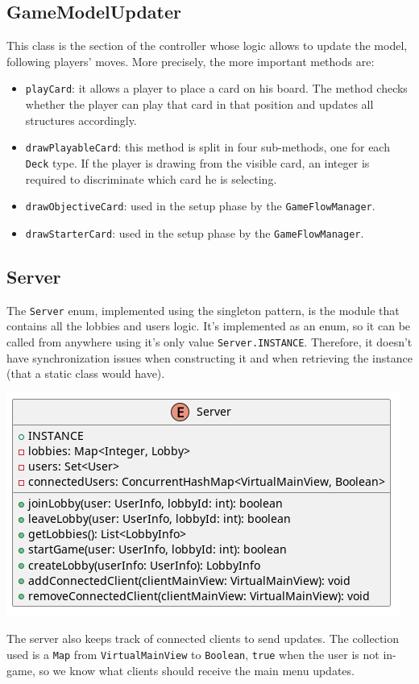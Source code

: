 \documentclass{article}
\begin{document}
\subsection{GameModelUpdater}
This class is the section of the controller whose logic allows to update the model, following players' moves.
More precisely, the more important methods are:
\begin{itemize}
    \item \texttt{playCard}: it allows a player to place a card on his board.
                             The method checks whether the player can play that card in that position and updates all structures accordingly.
    \item \texttt{drawPlayableCard}: this method is split in four sub-methods, one for each \texttt{Deck} type.
                              If the player is drawing from the visible card, an integer is required to discriminate which card he is selecting.
    \item \texttt{drawObjectiveCard}: used in the setup phase by the \texttt{GameFlowManager}.
    \item \texttt{drawStarterCard}: used in the setup phase by the \texttt{GameFlowManager}.
\end{itemize}

\subsection{Server}
The \texttt{Server} enum, implemented using the singleton pattern, is the module that contains all the lobbies and users logic.
It's implemented as an enum, so it can be called from anywhere using it's only value \texttt{Server.INSTANCE}.
Therefore, it doesn't have synchronization issues when constructing it and when retrieving the instance (that a static class would have).
\begin{center}
    \includegraphics[scale=0.5]{pngs/server}
\end{center}
The server also keeps track of connected clients to send updates.
The collection used is a \texttt{Map} from \texttt{VirtualMainView} to \texttt{Boolean}, \texttt{true} when the user is not
in-game, so we know what clients should receive the main menu updates.
\end{document}
